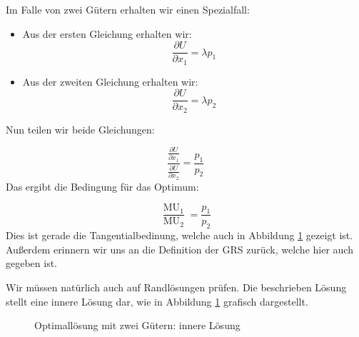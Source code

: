 \noindent Im Falle von zwei Gütern erhalten wir einen Spezialfall:
\begin{itemize}
	\item Aus der ersten Gleichung erhalten wir:
	      \[
		      \frac{\partial U}{\partial x_1} = \lambda p_1
	      \]
	\item Aus der zweiten Gleichung erhalten wir:
	      \[
		      \frac{\partial U}{\partial x_2} = \lambda p_2
	      \]
\end{itemize}
Nun teilen wir beide Gleichungen:

\[
	\frac{\frac{\partial U}{\partial x_1}}{\frac{\partial U}{\partial x_2}} = \frac{p_1}{p_2}
\]
Das ergibt die Bedingung für das Optimum:

\[
	\frac{\operatorname{MU}_1}{\operatorname{MU}_2} = \frac{p_1}{p_2}
\]
Dies ist gerade die Tangentialbedinung, welche auch in Abbildung \ref{fig:optimallösung-innere} gezeigt ist. Außerdem erinnern wir uns an die Definition der GRS zurück, welche hier auch gegeben ist.

\begin{remark}
	Wir müssen natürlich auch auf Randlösungen prüfen. Die beschrieben Lösung stellt eine innere Lösung dar, wie in Abbildung \ref{fig:optimallösung-innere} grafisch dargestellt.
\end{remark}
\begin{figure}[h!]
	\label{fig:optimallösung-innere}
	\caption{Optimallösung mit zwei Gütern: innere Lösung}
	\begin{center}


	\end{center}
\end{figure}

